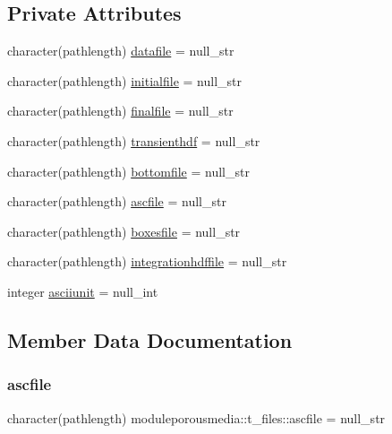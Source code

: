 \subsection*{Private Attributes}
\begin{DoxyCompactItemize}
\item 
character(pathlength) \mbox{\hyperlink{structmoduleporousmedia_1_1t__files_a93ee6a6d1d981ee5f8b6e43ce199bd4e}{datafile}} = null\+\_\+str
\item 
character(pathlength) \mbox{\hyperlink{structmoduleporousmedia_1_1t__files_a570cc448dc0ea462706228c72179b925}{initialfile}} = null\+\_\+str
\item 
character(pathlength) \mbox{\hyperlink{structmoduleporousmedia_1_1t__files_a08d50cfe8e59dfd430b287dda62958d9}{finalfile}} = null\+\_\+str
\item 
character(pathlength) \mbox{\hyperlink{structmoduleporousmedia_1_1t__files_a7a6ac61c7f9380b7ee5d8dab74309105}{transienthdf}} = null\+\_\+str
\item 
character(pathlength) \mbox{\hyperlink{structmoduleporousmedia_1_1t__files_a6f62e98637066f83c112689a3fb5ccc9}{bottomfile}} = null\+\_\+str
\item 
character(pathlength) \mbox{\hyperlink{structmoduleporousmedia_1_1t__files_a462926bf08c793bfc4503acb1fb2f64d}{ascfile}} = null\+\_\+str
\item 
character(pathlength) \mbox{\hyperlink{structmoduleporousmedia_1_1t__files_af0818a9608d68c0895a90271994d47c3}{boxesfile}} = null\+\_\+str
\item 
character(pathlength) \mbox{\hyperlink{structmoduleporousmedia_1_1t__files_aff577d2adf5a70f10a9bfe64356fbfe0}{integrationhdffile}} = null\+\_\+str
\item 
integer \mbox{\hyperlink{structmoduleporousmedia_1_1t__files_a89aa5266af17f22b3c9be7804a7ba2b1}{asciiunit}} = null\+\_\+int
\end{DoxyCompactItemize}


\subsection{Member Data Documentation}
\mbox{\label{structmoduleporousmedia_1_1t__files_a462926bf08c793bfc4503acb1fb2f64d}} 
\subsubsection{\texorpdfstring{ascfile}{ascfile}}
{\footnotesize\ttfamily character(pathlength) moduleporousmedia\+::t\+\_\+files\+::ascfile = null\+\_\+str\hspace{0.3cm}{\ttfamily [private]}}

